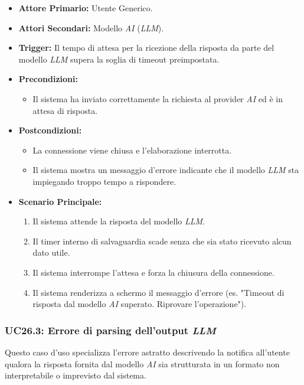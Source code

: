 \documentclass[12pt, a4paper]{article}
\begin{document}
\begin{itemize}
    \item \textbf{Attore Primario:} Utente Generico.
    \item \textbf{Attori Secondari:} Modello \textit{AI} (\textit{LLM}).
    \item \textbf{Trigger:} Il tempo di attesa per la ricezione della risposta da parte del modello \textit{LLM} supera la soglia di timeout preimpostata.
    \item \textbf{Precondizioni:}
    \begin{itemize}
        \item Il sistema ha inviato correttamente la richiesta al provider \textit{AI} ed è in attesa di risposta.
    \end{itemize}
    \item \textbf{Postcondizioni:}
    \begin{itemize}
        \item La connessione viene chiusa e l'elaborazione interrotta.
        \item Il sistema mostra un messaggio d'errore indicante che il modello \textit{LLM} sta impiegando troppo tempo a rispondere.
    \end{itemize}
    \item \textbf{Scenario Principale:}
    \begin{enumerate}
        \item Il sistema attende la risposta del modello \textit{LLM}.
        \item Il timer interno di salvaguardia scade senza che sia stato ricevuto alcun dato utile.
        \item Il sistema interrompe l'attesa e forza la chiusura della connessione.
        \item Il sistema renderizza a schermo il messaggio d'errore (es. "Timeout di risposta dal modello \textit{AI} superato. Riprovare l'operazione").
    \end{enumerate}
\end{itemize}

\subsubsection{UC26.3: Errore di parsing dell'output \textit{LLM}}\label{uc:26.3}
Questo caso d'uso specializza l'errore astratto descrivendo la notifica all'utente qualora la risposta fornita dal modello \textit{AI} sia strutturata in un formato non interpretabile o imprevisto dal sistema.
\end{document}
